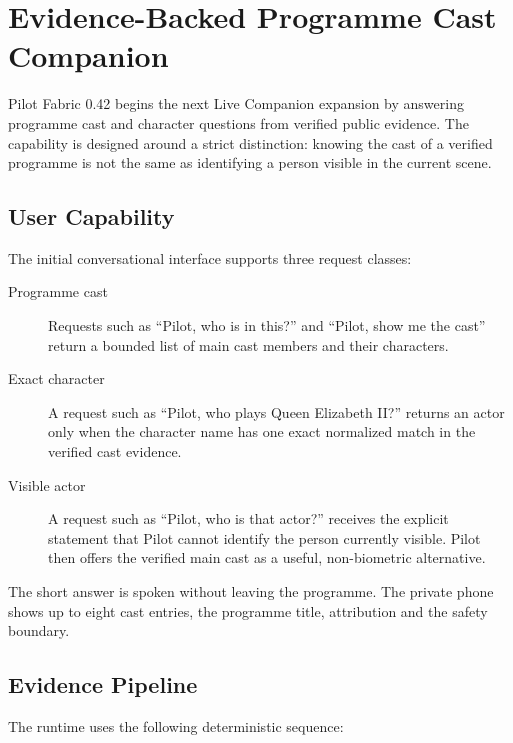 
\section{Evidence-Backed Programme Cast Companion}
\label{sec:programme-cast-companion}

Pilot Fabric 0.42 begins the next Live Companion expansion by answering programme
cast and character questions from verified public evidence. The capability is
designed around a strict distinction: knowing the cast of a verified programme is
not the same as identifying a person visible in the current scene.

\subsection{User Capability}

The initial conversational interface supports three request classes:

\begin{description}
  \item[Programme cast] Requests such as ``Pilot, who is in this?'' and
        ``Pilot, show me the cast'' return a bounded list of main cast members and
        their characters.
  \item[Exact character] A request such as ``Pilot, who plays Queen Elizabeth II?''
        returns an actor only when the character name has one exact normalized match
        in the verified cast evidence.
  \item[Visible actor] A request such as ``Pilot, who is that actor?'' receives the
        explicit statement that Pilot cannot identify the person currently visible.
        Pilot then offers the verified main cast as a useful, non-biometric alternative.
\end{description}

The short answer is spoken without leaving the programme. The private phone shows
up to eight cast entries, the programme title, attribution and the safety boundary.

\subsection{Evidence Pipeline}

The runtime uses the following deterministic sequence:

